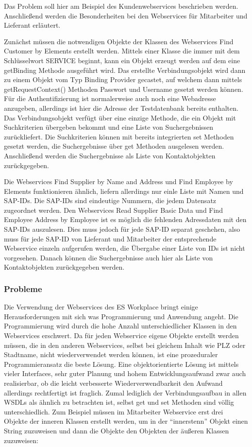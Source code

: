 Das Problem soll hier am Beispiel des Kundenwebservices beschrieben werden. Anschließend werden die Besonderheiten
bei den Webservices für Mitarbeiter und Lieferant erläutert.

Zunächst müssen die notwendigen Objekte der Klassen des Webservices Find Customer by Elements erstellt werden. Mittels
einer Klasse die immer mit dem Schlüsselwort SERVICE beginnt, kann ein Objekt erzeugt werden auf dem eine getBinding Methode
ausgeführt wird. Das erstellte Verbindungsobjekt wird dann zu einem Objekt vom Typ Binding Provider gecastet, auf welchem dann
mittels getRequestContext() Methoden Passwort und Username gesetzt werden können. Für die Authentifizierung ist normalerweise
auch noch eine Webadresse anzugeben, allerdings ist hier die Adresse der Testdatenbank bereits enthalten. Das 
Verbindungsobjekt verfügt über eine einzige Methode, die ein Objekt mit Suchkriterien übergeben bekommt und eine Liste 
von Suchergebnissen zurückliefert. Die Suchkriterien können mit bereits integrierten set Methoden gesetzt werden,
die Suchergebnisse über get Methoden ausgelesen werden. Anschließend werden die Suchergebnisse als Liste von Kontaktobjekten
zurückgegeben.

Die Webservices Find Supplier by Name and Address und Find Employee by Elements funktionieren ähnlich, liefern allerdings nur 
einle Liste mit Namen und SAP-IDs. Die SAP-IDs sind eindeutige Nummern, die jedem Datensatz zugeordnet werden. Den Webservices
Read Supplier Basic Data und Find Employee Address by Employee ist es möglich die fehlenden Adressdaten mit den SAP-IDs 
auszulesen. Dies muss jedoch für jede SAP-ID separat geschehen, also muss für jede SAP-ID von Lieferant und Mitarbeiter der
entsprechende Webservice einzeln aufgerufen werden, die Übergabe einer Liste von IDs ist nicht vorgesehen. Danach können 
die Suchergebnisse auch hier als Liste von Kontaktobjekten zurückgegeben werden.


\subsubsection{Probleme}

Die Verwendung der Webservices des ES Workplace bringt einige Herausforderungen mit sich was Programmierung und Anwendung
angeht. Die Programmierung wird durch die hohe Anzahl unterschiedlicher Klassen in den Webservices erschwert. Da für jeden
Webservice eigene Objekte erstellt werden müssen, die in den anderen Webservices, selbst bei gleichem Inhalt wie PLZ oder
Stadtname, nicht wiederverwendet werden können, ist eine prozeduraler Programmieransatz die beste Lösung. Eine objektorientierte 
Lösung ist mittels vieler Interfaces, sehr guter Planung und hohem Entwicklungsaufwand zwar auch realisierbar, ob die leicht 
verbesserte Wiederverwendbarkeit den Aufwand allerdings rechtfertigt ist fraglich. Zumal lediglich der Verbindungsaufbau in allen
WSDLs als ähnlich zu betrachten ist, selbst get und set Methoden sind völlig unterschiedlich. Zum Beispiel müssen im Mitarbeiter
Webservice erst drei Objekte der inneren Klassen erstellt werden, um in der ``innerstenn'' Objekt einen String zuzuweisen und 
dann die Objekte den Objekten der äußeren Klassen zuzuweisen:

